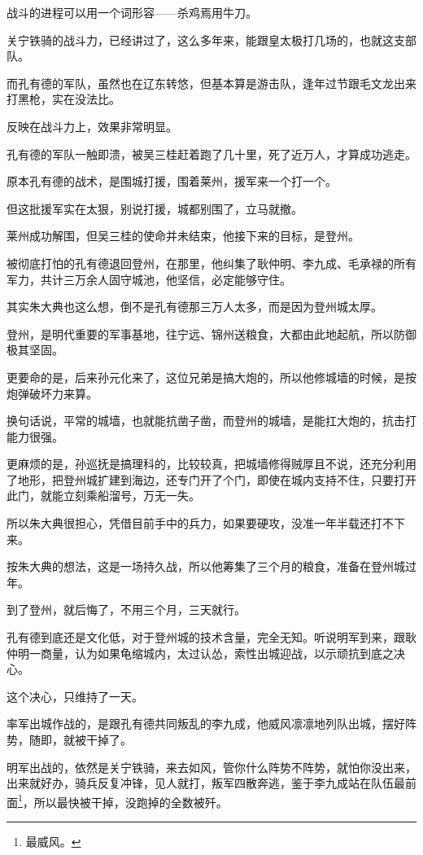 \begin{multicols}{\theparacolNo}
		战斗的进程可以用一个词形容——杀鸡焉用牛刀。

		关宁铁骑的战斗力，已经讲过了，这么多年来，能跟皇太极打几场的，也就这支部队。

		而孔有德的军队，虽然也在辽东转悠，但基本算是游击队，逢年过节跟毛文龙出来打黑枪，实在没法比。

		反映在战斗力上，效果非常明显。

		孔有德的军队一触即溃，被吴三桂赶着跑了几十里，死了近万人，才算成功逃走。

		原本孔有德的战术，是围城打援，围着莱州，援军来一个打一个。

		但这批援军实在太狠，别说打援，城都别围了，立马就撤。

		莱州成功解围，但吴三桂的使命并未结束，他接下来的目标，是登州。

		被彻底打怕的孔有德退回登州，在那里，他纠集了耿仲明、李九成、毛承禄的所有军力，共计三万余人固守城池，他坚信，必定能够守住。

		其实朱大典也这么想，倒不是孔有德那三万人太多，而是因为登州城太厚。

		登州，是明代重要的军事基地，往宁远、锦州送粮食，大都由此地起航，所以防御极其坚固。

		更要命的是，后来孙元化来了，这位兄弟是搞大炮的，所以他修城墙的时候，是按炮弹破坏力来算。

		换句话说，平常的城墙，也就能抗凿子凿，而登州的城墙，是能扛大炮的，抗击打能力很强。

		更麻烦的是，孙巡抚是搞理科的，比较较真，把城墙修得贼厚且不说，还充分利用了地形，把登州城扩建到海边，还专门开了个门，即使在城内支持不住，只要打开此门，就能立刻乘船溜号，万无一失。

		所以朱大典很担心，凭借目前手中的兵力，如果要硬攻，没准一年半载还打不下来。

		按朱大典的想法，这是一场持久战，所以他筹集了三个月的粮食，准备在登州城过年。

		到了登州，就后悔了，不用三个月，三天就行。

		孔有德到底还是文化低，对于登州城的技术含量，完全无知。听说明军到来，跟耿仲明一商量，认为如果龟缩城内，太过认怂，索性出城迎战，以示顽抗到底之决心。

		这个决心，只维持了一天。

		率军出城作战的，是跟孔有德共同叛乱的李九成，他威风凛凛地列队出城，摆好阵势，随即，就被干掉了。

		明军出战的，依然是关宁铁骑，来去如风，管你什么阵势不阵势，就怕你没出来，出来就好办，骑兵反复冲锋，见人就打，叛军四散奔逃，鉴于李九成站在队伍最前面\footnote{最威风。}，所以最快被干掉，没跑掉的全数被歼。


\end{multicols}

